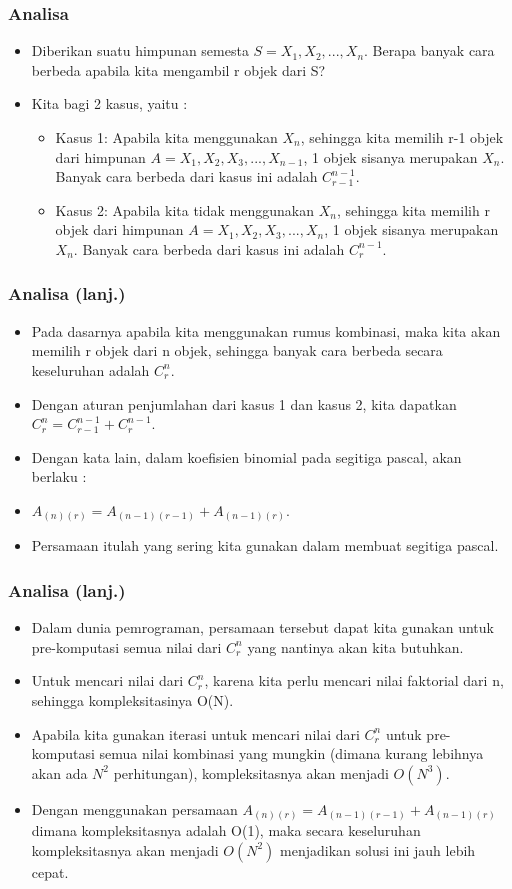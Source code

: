 \begin{frame}
\frametitle{Analisa}
\begin{itemize}
  \item Diberikan suatu himpunan semesta $S = {X_{1},X_{2},...,X_{n}}$. Berapa banyak cara berbeda apabila kita mengambil r objek dari S?
  \item Kita bagi 2 kasus, yaitu :
  \begin{itemize}
    \item Kasus 1: Apabila kita menggunakan $X_{n}$, sehingga kita memilih r-1 objek dari himpunan $A = {X_{1},X_{2},X_{3},...,X_{n-1}}$, 1 objek sisanya merupakan $X_{n}$. Banyak cara berbeda dari kasus ini adalah $C^{n-1}_{r-1}$.
    \item Kasus 2: Apabila kita tidak menggunakan $X_{n}$, sehingga kita memilih r objek dari himpunan $A = {X_{1},X_{2},X_{3},...,X_{n}}$, 1 objek sisanya merupakan $X_{n}$. Banyak cara berbeda dari kasus ini adalah $C^{n-1}_{r}$.
  \end{itemize}
\end{itemize}
\end{frame}

\begin{frame}
\frametitle{Analisa (lanj.)}
\begin{itemize}
  \item Pada dasarnya apabila kita menggunakan rumus kombinasi, maka kita akan memilih r objek dari n objek, sehingga banyak cara berbeda secara keseluruhan adalah $C^{n}_{r}$.
  \item Dengan aturan penjumlahan dari kasus 1 dan kasus 2, kita dapatkan $C^{n}_{r} = C^{n-1}_{r-1} + C^{n-1}_{r}$.
  \item Dengan kata lain, dalam koefisien binomial pada segitiga pascal, akan berlaku :
  \item $A_{(n)(r)} = A_{(n-1)(r-1)} + A_{(n-1)(r)}$.
  \item Persamaan itulah yang sering kita gunakan dalam membuat segitiga pascal.
\end{itemize}
\end{frame}

\begin{frame}
\frametitle{Analisa (lanj.)}
\begin{itemize}
  \item Dalam dunia pemrograman, persamaan tersebut dapat kita gunakan untuk pre-komputasi semua nilai dari $C^{n}_{r}$ yang nantinya akan kita butuhkan.
  \item Untuk mencari nilai dari $C^{n}_{r}$, karena kita perlu mencari nilai faktorial dari n, sehingga kompleksitasinya O(N).
  \item Apabila kita gunakan iterasi untuk mencari nilai dari $C^{n}_{r}$ untuk pre-komputasi semua nilai kombinasi yang mungkin (dimana kurang lebihnya akan ada $N^{2}$ perhitungan), kompleksitasnya akan menjadi $O(N^{3})$.
  \item Dengan menggunakan persamaan $A_{(n)(r)} = A_{(n-1)(r-1)} + A_{(n-1)(r)}$ dimana kompleksitasnya adalah O(1), maka secara keseluruhan kompleksitasnya akan menjadi $O(N^{2})$ menjadikan solusi ini jauh lebih cepat.
\end{itemize}
\end{frame}

